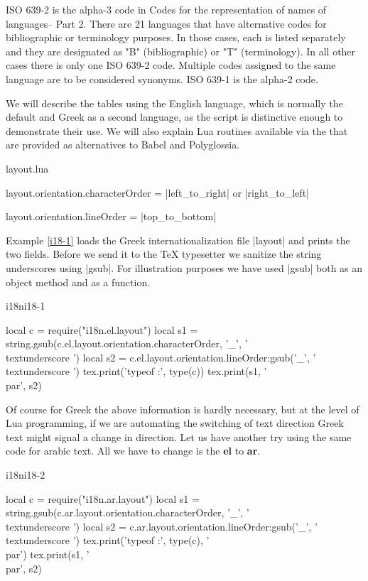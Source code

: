 ISO 639-2 is the alpha-3 code in Codes for the representation of names of languages-- Part 2. There are 21 languages that have alternative codes for bibliographic or terminology purposes. In those cases, each is listed separately and they are designated as "B" (bibliographic) or "T" (terminology). In all other cases there is only one ISO 639-2 code. Multiple codes assigned to the same language are to be considered synonyms. ISO 639-1 is the alpha-2 code.

We will describe the tables using the English language, which is normally the default and Greek as a second language, as the script is distinctive enough to demonstrate their use. We will also explain Lua routines available via the  that are provided as alternatives to Babel and Polyglossia.

{layout.lua}

{layout.orientation.characterOrder} = |left_to_right| or |right_to_left|

layout.orientation.lineOrder = |top_to_bottom|

Example \ref{i18-1} loads the Greek internationalization file |layout| and prints the two fields. Before we send it to
the TeX typesetter we sanitize the string underscores using |gsub|. For illustration purposes we have used |gsub| both as an object method and as a function.

\begin{texexample}{i18n}{i18-1}
\begin{luacode}
local c = require("i18n.el.layout")
local s1 = string.gsub(c.el.layout.orientation.characterOrder, '_', '\\textunderscore ')
local s2 = c.el.layout.orientation.lineOrder:gsub('_', '\\textunderscore ')
tex.print('typeof :', type(c))
tex.print(s1, '\\par', s2)
\end{luacode}
\end{texexample}

Of course for Greek the above information is hardly necessary, but at the level of Lua programming, if we are automating the switching of text direction Greek text might signal a change in direction. Let us have another try using the same code for arabic text. All we have to change is the \textbf{el} to \textbf{ar}.

\begin{texexample}{i18n}{i18-2}
\begin{luacode}
local c = require("i18n.ar.layout")
local s1 = string.gsub(c.ar.layout.orientation.characterOrder, '_', '\\textunderscore ')
local s2 = c.ar.layout.orientation.lineOrder:gsub('_', '\\textunderscore ')
tex.print('typeof :', type(c), '\\par')
tex.print(s1, '\\par', s2)
\end{luacode}
\end{texexample}

